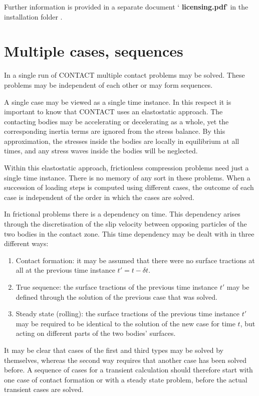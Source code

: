 \documentclass[12pt]{report}
\begin{document}
Further information is provided in a separate document `{\bf
licensing.pdf}' in the installation folder \cite{memo21004-licensing}.

\section{Multiple cases, sequences}
\label{sec:cases}

In a single run of CONTACT multiple contact problems may be solved. These
problems may be independent of each other or may form sequences.

A single case may be viewed as a single time instance. In this respect it
is important to know that CONTACT uses an elastostatic approach. The
contacting bodies may be accelerating or decelerating as a whole, yet 
the corresponding inertia terms are ignored from the stress balance.
By this approximation, the stresses inside the bodies are locally in
equilibrium at all times, and any stress waves inside the bodies will
be neglected.

Within this elastostatic approach, frictionless compression problems
need just a single time instance. There is no memory of any sort in these
problems. When a succession of loading steps is computed using different
cases, the outcome of each case is independent of the order in which the
cases are solved.

In frictional problems there is a dependency on time. This dependency
arises through the discretisation of the slip velocity 
between opposing particles of the two bodies in the contact zone. This
time dependency may be dealt with in three different ways:
\begin{enumerate}
\item Contact formation: it may be assumed that there were no surface
        tractions at all at the previous time instance $t'=t-\delta t$.
\item True sequence: the surface tractions of the previous time instance
        $t'$ may be defined through the solution of the previous case that
        was solved.
\item Steady state (rolling): the surface tractions of the previous time
        instance $t'$ may be required to be identical to the solution of
        the new case for time $t$, but acting on different parts of the two
        bodies' surfaces.
\end{enumerate}
It may be clear that cases of the first and third types may be solved by
themselves, whereas the second way requires that another case has been
solved before. A sequence of cases for a transient calculation should
therefore start with one case of contact formation or with a steady state
problem, before the actual transient cases are solved.
\end{document}
